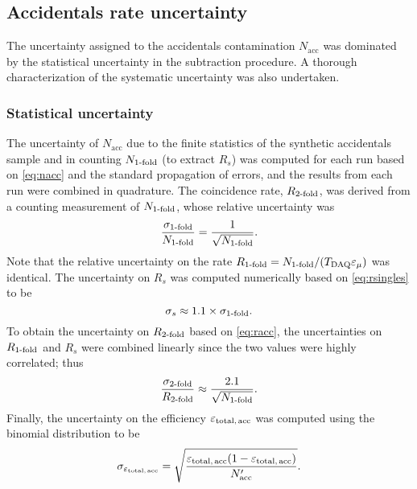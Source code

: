 \subsection{Accidentals rate uncertainty}
\label{subsec:acc_err}

The uncertainty assigned to the accidentals contamination $N_\text{acc}$
was dominated by the statistical uncertainty in the subtraction procedure.
A thorough characterization of the systematic uncertainty
was also undertaken.

\subsubsection{Statistical uncertainty}

The uncertainty of $N_{\text{acc}}$ due to the finite statistics
of the synthetic accidentals sample
and in counting $N_{\text{\ensuremath{1}-fold}}$ (to extract $R_s$)
was computed for each run based on \cref{eq:nacc}
and the standard propagation of errors,
and the results from each run were combined in quadrature.
The  coincidence rate, $R_\text{\ensuremath{2}-fold}$,
was derived from a counting measurement of $N_\text{\ensuremath{1}-fold}$,
whose relative uncertainty was
\begin{equation}\label{eq:sigma_1fold}
    \frac{\sigma_\text{\ensuremath{1}-fold}}{N_\text{\ensuremath{1}-fold}} =
    \frac{1}{\sqrt{N_\text{\ensuremath{1}-fold}}}.
\end{equation}
Note that the relative uncertainty on the rate
$R_\text{\ensuremath{1}-fold} = N_\text{\ensuremath{1}-fold}/(T_\text{DAQ}\varepsilon_\mu)$ was identical.
The uncertainty on $R_s$ was computed numerically
based on \cref{eq:rsingles} to be
\begin{equation}\label{eq:sigma_rs}
    \sigma_s \approx 1.1\times\sigma_\text{\ensuremath{1}-fold}.
\end{equation}
To obtain the uncertainty on $R_\text{\ensuremath{2}-fold}$ based on \cref{eq:racc},
the uncertainties on $R_\text{\ensuremath{1}-fold}$ and $R_s$ were combined linearly
since the two values were highly correlated; thus
\begin{equation}\label{eq:sigma_2fold}
    \frac{\sigma_\text{\ensuremath{2}-fold}}{R_\text{\ensuremath{2}-fold}} \approx
    \frac{2.1}{\sqrt{N_\text{\ensuremath{1}-fold}}}.
\end{equation}
Finally, the uncertainty on the efficiency $\varepsilon_\text{total,\,acc}$
was computed using the binomial distribution to be
\begin{equation}\label{eq:sigma_eps_acc}
    \sigma_{\varepsilon_\text{total,\,acc}} =
    \sqrt{
        \frac{
            \varepsilon_\text{total,\,acc} (1 - \varepsilon_\text{total,\,acc})
        }{N_\text{acc}'}
    }.
\end{equation}
